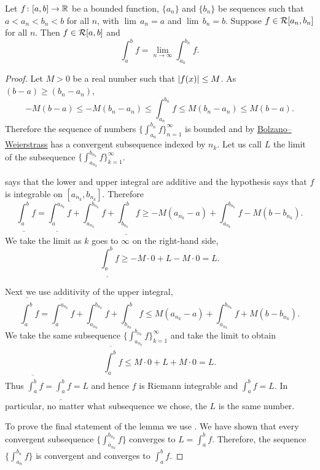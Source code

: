 \begin{lemma} \label{lemma:boundedimpriemann}
Let $f \colon [a,b] \to {\mathbb{R}}$ be a bounded function,
$\{ a_n \}$ and $\{b_n \}$ be sequences such that
$a < a_n < b_n < b$ for all $n$, with
$\lim \, a_n = a$ and $\lim \, b_n = b$.
Suppose $f \in {\mathcal{R}}[a_n,b_n]$ for all $n$.
Then $f \in {\mathcal{R}}[a,b]$ and
\begin{equation*}
\int_a^b f = 
\lim_{n \to \infty} \int_{a_n}^{b_n} f .
\end{equation*}
\end{lemma}

\begin{proof}
Let $M > 0$ be a real number such that $\left\lvert {f(x)} \right\rvert \leq M$.
As $(b-a) \geq (b_n-a_n)$,
\begin{equation*}
-M(b-a) \leq
-M(b_n-a_n) \leq
\int_{a_n}^{b_n} f
\leq
M(b_n-a_n) \leq
M(b-a) .
\end{equation*}
Therefore the sequence of numbers
$\{ \int_{a_n}^{b_n} f \}_{n=1}^\infty$ is bounded and by
\hyperref[thm:bwseq]{Bolzano--Weierstrass}
has a convergent subsequence indexed by $n_k$.  Let us call
$L$ the limit of the subsequence
$\{ \int_{a_{n_k}}^{b_{n_k}} f \}_{k=1}^\infty$.

 says that
the lower and upper integral are additive
and the hypothesis says that
$f$ is integrable on $[a_{n_k},b_{n_k}]$.
Therefore
\begin{equation*}
\underline{\int_a^b} f
=
\underline{\int_a^{a_{n_k}}} f
+
\int_{a_{n_k}}^{b_{n_k}} f
+
\underline{\int_{b_{n_k}}^b} f
\geq
-M(a_{n_k}-a)
+
\int_{a_{n_k}}^{b_{n_k}} f
-
M(b-b_{n_k}) .
\end{equation*}
We take the limit as $k$ goes to $\infty$ on the right-hand side,
\begin{equation*}
\underline{\int_a^b} f
\geq
-M\cdot 0
+
L
-
M\cdot 0
= L .
\end{equation*}

Next we use additivity of the upper integral,
\begin{equation*}
\overline{\int_a^b} f
=
\overline{\int_a^{a_{n_k}}} f
+
\int_{a_{n_k}}^{b_{n_k}} f
+
\overline{\int_{b_{n_k}}^b} f
\leq
M(a_{n_k}-a)
+
\int_{a_{n_k}}^{b_{n_k}} f
+
M(b-b_{n_k}) .
\end{equation*}
We take the same subsequence 
$\{ \int_{a_{n_k}}^{b_{n_k}} f \}_{k=1}^\infty$ and take the limit 
to obtain
\begin{equation*}
\overline{\int_a^b} f
\leq
M\cdot 0
+
L
+
M\cdot 0
= L .
\end{equation*}
Thus $\overline{\int_a^b} f = \underline{\int_a^b} f = L$
and hence $f$ is Riemann integrable and $\int_a^b f = L$.
In particular, no matter what
subsequence we chose,
the $L$ is the same number.

To prove the final statement of the lemma we use 
.  We have shown that every convergent
subsequence
$\{ \int_{a_{n_k}}^{b_{n_k}} f \}$ converges to $L = \int_a^b f$.
Therefore, the sequence
$\{ \int_{a_n}^{b_n} f \}$ is convergent and converges to $\int_a^b f$.
\end{proof}

